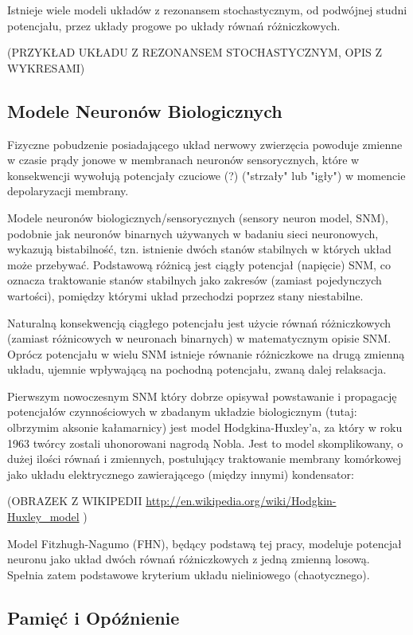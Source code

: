 \documentclass[12pt]{article}
\begin{document}
  Istnieje wiele modeli układów z rezonansem stochastycznym, od podwójnej studni potencjału, przez układy progowe po układy równań różniczkowych.
  
  (PRZYKŁAD UKŁADU Z REZONANSEM STOCHASTYCZNYM, OPIS Z WYKRESAMI)
  
  \subsection{Modele Neuronów Biologicznych}
  
  Fizyczne pobudzenie posiadającego układ nerwowy zwierzęcia powoduje zmienne w czasie prądy jonowe w membranach neuronów sensorycznych, które w konsekwencji wywołują potencjały czuciowe (?) ("strzały" lub "igły") w momencie depolaryzacji membrany.
  
  Modele neuronów biologicznych/sensorycznych (sensory neuron model, SNM), podobnie jak neuronów binarnych używanych w badaniu sieci neuronowych, wykazują bistabilność, tzn. istnienie dwóch stanów stabilnych w których układ może przebywać. Podstawową różnicą jest ciągły potencjał (napięcie) SNM, co oznacza traktowanie stanów stabilnych jako zakresów (zamiast pojedynczych wartości), pomiędzy którymi układ przechodzi poprzez stany niestabilne. 
  
  Naturalną konsekwencją ciągłego potencjału jest użycie równań różniczkowych (zamiast różnicowych w neuronach binarnych) w matematycznym opisie SNM. Oprócz potencjału w wielu SNM istnieje równanie różniczkowe na drugą zmienną układu, ujemnie wpływającą na pochodną potencjału, zwaną dalej relaksacja.
  
  Pierwszym nowoczesnym SNM który dobrze opisywał powstawanie i propagację potencjałów czynnościowych w zbadanym układzie biologicznym (tutaj: olbrzymim aksonie kałamarnicy) jest model Hodgkina-Huxley'a, za który w roku 1963 twórcy zostali uhonorowani nagrodą Nobla. Jest to model skomplikowany, o dużej ilości równań i zmiennych, postulujący traktowanie membrany komórkowej jako układu elektrycznego zawierającego (między innymi) kondensator:
  
  (OBRAZEK Z WIKIPEDII \url{http://en.wikipedia.org/wiki/Hodgkin-Huxley_model} )
  
  Model Fitzhugh-Nagumo (FHN), będący podstawą tej pracy, modeluje potencjał neuronu jako układ dwóch równań różniczkowych z jedną zmienną losową. Spełnia zatem podstawowe kryterium układu nieliniowego (chaotycznego).
  
  \subsection{Pamięć i Opóźnienie}
  
\end{document}
